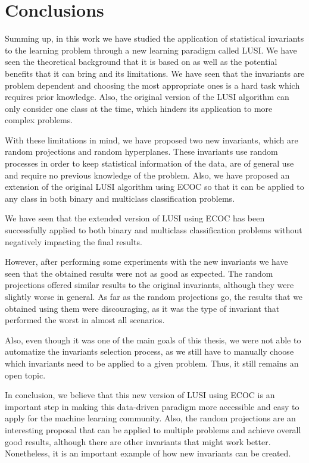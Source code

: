 
\chapter{Conclusions} %
\label{Chapter5}

Summing up, in this work we have studied the application of statistical invariants to the learning
problem through a new learning paradigm called LUSI. We have seen the theoretical background
that it is based on as well as the potential benefits that it can bring and its limitations.
We have seen that the invariants are problem dependent and choosing the most appropriate ones
is a hard task which requires prior knowledge. Also, the original version of the LUSI algorithm
can only consider one class at the time, which hinders its application to more complex problems.

With these limitations in mind, we have proposed two new invariants, which are random projections
and random hyperplanes. These invariants use random processes in order to keep statistical information
of the data, are of general use and require no previous knowledge of the problem. Also, we have
proposed an extension of the original LUSI algorithm using ECOC so that it can be applied to any
class in both binary and multiclass classification problems.

We have seen that the extended version of LUSI using ECOC has been successfully applied to both
binary and multiclass classification problems without negatively impacting the final results.

However, after performing some experiments with the new invariants we have seen that the obtained
results were not as good as expected. The random projections offered similar results to the original
invariants, although they were slightly worse in general. As far as the random projections go, the
results that we obtained using them were discouraging, as it was the type of invariant that performed
the worst in almost all scenarios.

Also, even though it was one of the main goals of this thesis, we were not able to automatize
the invariants selection process, as we still have to manually choose which invariants need to be
applied to a given problem. Thus, it still remains an open topic.

In conclusion, we believe that this new version of LUSI using ECOC is an important step in making
this data-driven paradigm more accessible and easy to apply for the machine learning community.
Also, the random projections are an interesting proposal that can be applied to multiple problems
and achieve overall good results, although there are other invariants that might work better.
Nonetheless, it is an important example of how new invariants can be created.

